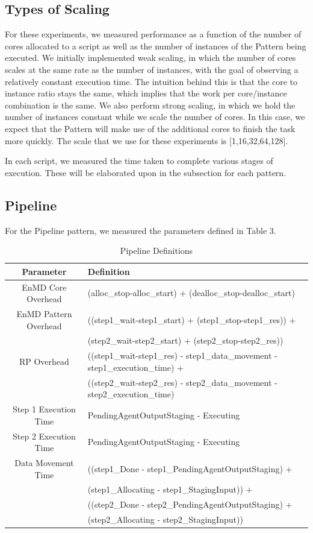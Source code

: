 \documentclass[]{article}
\begin{document}
	\subsection{Types of Scaling}
		For these experiments, we measured performance as a function of the number of cores allocated to a script as well as the number of instances of the Pattern being executed. We initially implemented weak scaling, in which the number of cores scales at the same rate as the number of instances, with the goal of observing a relatively constant execution time. The intuition behind this is that the core to instance ratio stays the same, which implies that the work per core/instance combination is the same. We also perform strong scaling, in which we hold the number of instances constant while we scale the number of cores. In this case, we expect that the Pattern will make use of the additional cores to finish the task more quickly. The scale that we use for these experiments is [1,16,32,64,128].

		In each script, we measured the time taken to complete various stages of execution. These will be elaborated upon in the subsection for each pattern.

	\subsection{Pipeline}
		For the Pipeline pattern, we measured the parameters defined in Table 3. 

		\begin{table}[H]
		\centering
			\begin{tabular}{|c|p{10cm}|}
				\hline
				Parameter & Definition  \\
				\hline
				EnMD Core Overhead & (alloc\_stop-alloc\_start) +  (dealloc\_stop-dealloc\_start) \\
				\hline
				EnMD Pattern Overhead & ((step1\_wait-step1\_start) + (step1\_stop-step1\_res)) + \\ 
									  &	(step2\_wait-step2\_start) + (step2\_stop-step2\_res)) \\
				\hline
				RP Overhead & ((step1\_wait-step1\_res) - step1\_data\_movement - step1\_execution\_time) + \\
							&	((step2\_wait-step2\_res) - step2\_data\_movement - step2\_execution\_time) \\
				\hline
				Step 1 Execution Time & PendingAgentOutputStaging - Executing \\
				\hline
				Step 2 Execution Time & PendingAgentOutputStaging - Executing \\
				\hline
				Data Movement Time & ((step1\_Done - step1\_PendingAgentOutputStaging) + \\ 
								   &	(step1\_Allocating - step1\_StagingInput)) + \\
								   &	((step2\_Done - step2\_PendingAgentOutputStaging) + \\
								   &	(step2\_Allocating - step2\_StagingInput)) \\
				\hline
			\end{tabular}
			\caption{Pipeline Definitions}
			\label{table:pipeline_definitions}
		\end{table}
\end{document}
